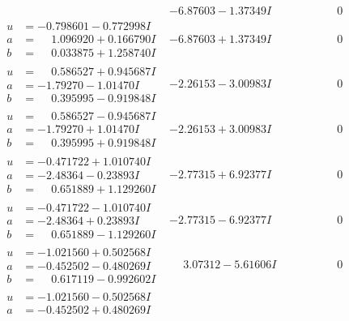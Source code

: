 \documentclass[1p]{elsarticle_modified}
\theoremstyle{definition}
\begin{document}
$$\begin{array}{c|c|c}
 & -6.87603 - 1.37349 I & \phantom{-0.000000 } 0 \\ \hline\begin{aligned}
u &= -0.798601 - 0.772998 I \\
a &= \phantom{-}1.096920 + 0.166790 I \\
b &= \phantom{-}0.033875 + 1.258740 I\end{aligned}
 & -6.87603 + 1.37349 I & \phantom{-0.000000 } 0 \\ \hline\begin{aligned}
u &= \phantom{-}0.586527 + 0.945687 I \\
a &= -1.79270 - 1.01470 I \\
b &= \phantom{-}0.395995 - 0.919848 I\end{aligned}
 & -2.26153 - 3.00983 I & \phantom{-0.000000 } 0 \\ \hline\begin{aligned}
u &= \phantom{-}0.586527 - 0.945687 I \\
a &= -1.79270 + 1.01470 I \\
b &= \phantom{-}0.395995 + 0.919848 I\end{aligned}
 & -2.26153 + 3.00983 I & \phantom{-0.000000 } 0 \\ \hline\begin{aligned}
u &= -0.471722 + 1.010740 I \\
a &= -2.48364 - 0.23893 I \\
b &= \phantom{-}0.651889 + 1.129260 I\end{aligned}
 & -2.77315 + 6.92377 I & \phantom{-0.000000 } 0 \\ \hline\begin{aligned}
u &= -0.471722 - 1.010740 I \\
a &= -2.48364 + 0.23893 I \\
b &= \phantom{-}0.651889 - 1.129260 I\end{aligned}
 & -2.77315 - 6.92377 I & \phantom{-0.000000 } 0 \\ \hline\begin{aligned}
u &= -1.021560 + 0.502568 I \\
a &= -0.452502 - 0.480269 I \\
b &= \phantom{-}0.617119 - 0.992602 I\end{aligned}
 & \phantom{-}3.07312 - 5.61606 I & \phantom{-0.000000 } 0 \\ \hline\begin{aligned}
u &= -1.021560 - 0.502568 I \\
a &= -0.452502 + 0.480269 I \\

\end{aligned}
\end{array}$$
\end{document}

